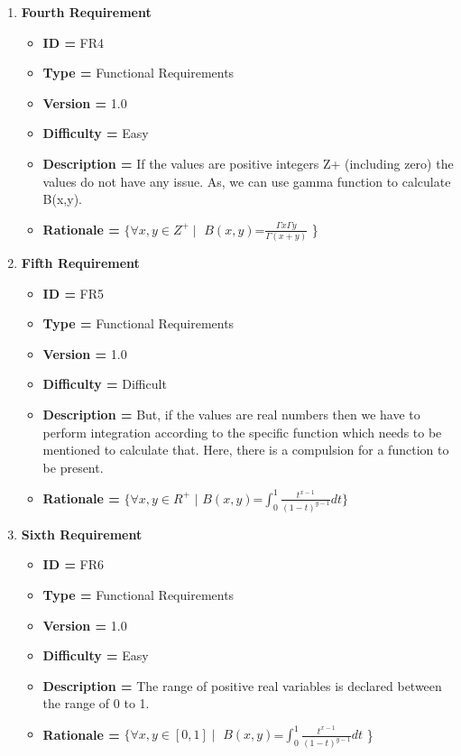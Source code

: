 \documentclass{report}
\begin{document}
\begin{enumerate}[noitemsep]
        \newpage
        \item \textbf{Fourth Requirement}
        \begin{itemize}
            \item \textbf{ID = } FR4
            \item\textbf{Type = } Functional Requirements
            \item\textbf{Version = } 1.0
            \item\textbf{Difficulty = } Easy
            \item\textbf{Description = } If the values are positive integers Z+ (including zero) the values do not have any issue. As, we can use gamma function to calculate B(x,y).
            \item\textbf{Rationale = } $\{ \forall x,y \in Z^+ \mid$ $B(x,y)$=$\frac{{\Gamma x} {\Gamma y}}{\Gamma (x+y)}$ \}
        \end{itemize}
        
        \item \textbf{Fifth Requirement}
        \begin{itemize}
            \item \textbf{ID = } FR5
            \item\textbf{Type = } Functional Requirements
            \item\textbf{Version = } 1.0
            \item\textbf{Difficulty = } Difficult
            \item\textbf{Description = } But, if the values are real numbers then we have to perform integration according to the specific function which needs to be mentioned to calculate that. Here, there is a compulsion for a function to be present.
            \item\textbf{Rationale = } $\{ \forall x,y \in $$R^+$ $\mid$ $B(x,y)$=$\int_{0}^{1} \frac{t^{x-1}}{(1-t)^{y-1}} dt\}$
        \end{itemize}
        
        \item \textbf{Sixth Requirement}
        \begin{itemize}
            \item \textbf{ID = } FR6
            \item\textbf{Type = } Functional Requirements
            \item\textbf{Version = } 1.0
            \item\textbf{Difficulty = } Easy
            \item\textbf{Description = } The range of positive real variables is declared between the range of  0 to 1.
            \item\textbf{Rationale = } $\{ \forall x,y \in [0,1] \mid$ $B(x,y)$=$\int_{0}^{1} \frac{t^{x-1}}{(1-t)^{y-1}} dt$ \} 
        \end{itemize}
        

\end{enumerate}
\end{document}
